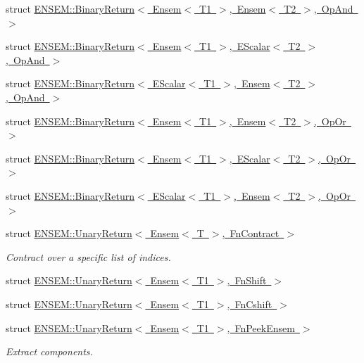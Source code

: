 \begin{DoxyCompactItemize}
\item 
struct \mbox{\hyperlink{structENSEM_1_1BinaryReturn_3_01Ensem_3_01T1_01_4_00_01Ensem_3_01T2_01_4_00_01OpAnd_01_4}{E\+N\+S\+E\+M\+::\+Binary\+Return$<$ Ensem$<$ T1 $>$, Ensem$<$ T2 $>$, Op\+And $>$}}
\item 
struct \mbox{\hyperlink{structENSEM_1_1BinaryReturn_3_01Ensem_3_01T1_01_4_00_01EScalar_3_01T2_01_4_00_01OpAnd_01_4}{E\+N\+S\+E\+M\+::\+Binary\+Return$<$ Ensem$<$ T1 $>$, E\+Scalar$<$ T2 $>$, Op\+And $>$}}
\item 
struct \mbox{\hyperlink{structENSEM_1_1BinaryReturn_3_01EScalar_3_01T1_01_4_00_01Ensem_3_01T2_01_4_00_01OpAnd_01_4}{E\+N\+S\+E\+M\+::\+Binary\+Return$<$ E\+Scalar$<$ T1 $>$, Ensem$<$ T2 $>$, Op\+And $>$}}
\item 
struct \mbox{\hyperlink{structENSEM_1_1BinaryReturn_3_01Ensem_3_01T1_01_4_00_01Ensem_3_01T2_01_4_00_01OpOr_01_4}{E\+N\+S\+E\+M\+::\+Binary\+Return$<$ Ensem$<$ T1 $>$, Ensem$<$ T2 $>$, Op\+Or $>$}}
\item 
struct \mbox{\hyperlink{structENSEM_1_1BinaryReturn_3_01Ensem_3_01T1_01_4_00_01EScalar_3_01T2_01_4_00_01OpOr_01_4}{E\+N\+S\+E\+M\+::\+Binary\+Return$<$ Ensem$<$ T1 $>$, E\+Scalar$<$ T2 $>$, Op\+Or $>$}}
\item 
struct \mbox{\hyperlink{structENSEM_1_1BinaryReturn_3_01EScalar_3_01T1_01_4_00_01Ensem_3_01T2_01_4_00_01OpOr_01_4}{E\+N\+S\+E\+M\+::\+Binary\+Return$<$ E\+Scalar$<$ T1 $>$, Ensem$<$ T2 $>$, Op\+Or $>$}}
\item 
struct \mbox{\hyperlink{structENSEM_1_1UnaryReturn_3_01Ensem_3_01T_01_4_00_01FnContract_01_4}{E\+N\+S\+E\+M\+::\+Unary\+Return$<$ Ensem$<$ T $>$, Fn\+Contract $>$}}
\begin{DoxyCompactList}\small\item\em Contract over a specific list of indices. \end{DoxyCompactList}\item 
struct \mbox{\hyperlink{structENSEM_1_1UnaryReturn_3_01Ensem_3_01T1_01_4_00_01FnShift_01_4}{E\+N\+S\+E\+M\+::\+Unary\+Return$<$ Ensem$<$ T1 $>$, Fn\+Shift $>$}}
\item 
struct \mbox{\hyperlink{structENSEM_1_1UnaryReturn_3_01Ensem_3_01T1_01_4_00_01FnCshift_01_4}{E\+N\+S\+E\+M\+::\+Unary\+Return$<$ Ensem$<$ T1 $>$, Fn\+Cshift $>$}}
\item 
struct \mbox{\hyperlink{structENSEM_1_1UnaryReturn_3_01Ensem_3_01T1_01_4_00_01FnPeekEnsem_01_4}{E\+N\+S\+E\+M\+::\+Unary\+Return$<$ Ensem$<$ T1 $>$, Fn\+Peek\+Ensem $>$}}
\begin{DoxyCompactList}\small\item\em Extract components. \end{DoxyCompactList}\item 

\end{DoxyCompactItemize}
